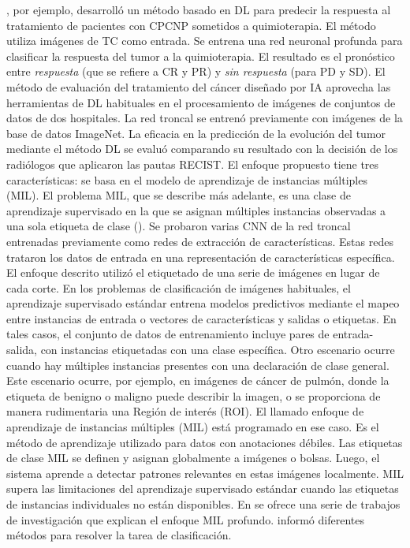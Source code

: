\documentclass[11pt,a4paper,openany]{article}
\begin{document}
        \cite{Chang2022}, por ejemplo, desarrolló un método basado en DL para predecir la respuesta al tratamiento de pacientes con CPCNP sometidos a quimioterapia. El método utiliza imágenes de TC como entrada. Se entrena una red neuronal profunda para clasificar la respuesta del tumor a la quimioterapia. El resultado es el pronóstico entre \textit{respuesta} (que se refiere a CR y PR) y \textit{sin respuesta} (para PD y SD). El método de evaluación del tratamiento del cáncer diseñado por IA aprovecha las herramientas de DL habituales en el procesamiento de imágenes de conjuntos de datos de dos hospitales. La red troncal se entrenó previamente con imágenes de la base de datos ImageNet. La eficacia en la predicción de la evolución del tumor mediante el método DL se evaluó comparando su resultado con la decisión de los radiólogos que aplicaron las pautas RECIST. El enfoque propuesto tiene tres características: se basa en el modelo de aprendizaje de instancias múltiples (MIL). El problema MIL, que se describe más adelante, es una clase de aprendizaje supervisado en la que se asignan múltiples instancias observadas a una sola etiqueta de clase (\cite{Javed2022}). Se probaron varias CNN de la red troncal entrenadas previamente como redes de extracción de características. Estas redes trataron los datos de entrada en una representación de características específica. \\

        El enfoque descrito utilizó el etiquetado de una serie de imágenes en lugar de cada corte. En los problemas de clasificación de imágenes habituales, el aprendizaje supervisado estándar entrena modelos predictivos mediante el mapeo entre instancias de entrada o vectores de características y salidas o etiquetas. En tales casos, el conjunto de datos de entrenamiento incluye pares de entrada-salida, con instancias etiquetadas con una clase específica. Otro escenario ocurre cuando hay múltiples instancias presentes con una declaración de clase general. Este escenario ocurre, por ejemplo, en imágenes de cáncer de pulmón, donde la etiqueta de benigno o maligno puede describir la imagen, o se proporciona de manera rudimentaria una Región de interés (ROI). El llamado enfoque de aprendizaje de instancias múltiples (MIL) está programado en ese caso. Es el método de aprendizaje utilizado para datos con anotaciones débiles. Las etiquetas de clase MIL se definen y asignan globalmente a imágenes o bolsas. Luego, el sistema aprende a detectar patrones relevantes en estas imágenes localmente. MIL supera las limitaciones del aprendizaje supervisado estándar cuando las etiquetas de instancias individuales no están disponibles. En \cite{waqas_exploring_2024,ilse18a,quellec_multiple-instance_2017} se ofrece una serie de trabajos de investigación que explican el enfoque MIL profundo. \cite{ilse18a} informó diferentes métodos para resolver la tarea de clasificación. \\
\end{document}
